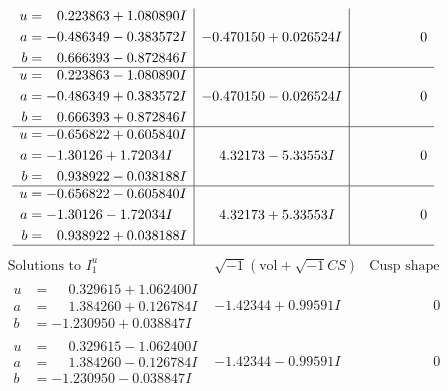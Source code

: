 \documentclass[1p]{elsarticle_modified}
\theoremstyle{definition}
\newcommand{\I}{\sqrt{-1}}
\begin{document}
$$\begin{array}{c|c|c}
\begin{aligned}
u &= \phantom{-}0.223863 + 1.080890 I \\
a &= -0.486349 - 0.383572 I \\
b &= \phantom{-}0.666393 - 0.872846 I\end{aligned}
 & -0.470150 + 0.026524 I & \phantom{-0.000000 } 0 \\ \hline\begin{aligned}
u &= \phantom{-}0.223863 - 1.080890 I \\
a &= -0.486349 + 0.383572 I \\
b &= \phantom{-}0.666393 + 0.872846 I\end{aligned}
 & -0.470150 - 0.026524 I & \phantom{-0.000000 } 0 \\ \hline\begin{aligned}
u &= -0.656822 + 0.605840 I \\
a &= -1.30126 + 1.72034 I \\
b &= \phantom{-}0.938922 - 0.038188 I\end{aligned}
 & \phantom{-}4.32173 - 5.33553 I & \phantom{-0.000000 } 0 \\ \hline\begin{aligned}
u &= -0.656822 - 0.605840 I \\
a &= -1.30126 - 1.72034 I \\
b &= \phantom{-}0.938922 + 0.038188 I\end{aligned}
 & \phantom{-}4.32173 + 5.33553 I & \phantom{-0.000000 } 0\\
 \hline 
 \end{array}$$\newpage$$\begin{array}{c|c|c}  
\text{Solutions to }I^u_{1}& \I (\text{vol} + \sqrt{-1}CS) & \text{Cusp shape}\\
 \hline 
\begin{aligned}
u &= \phantom{-}0.329615 + 1.062400 I \\
a &= \phantom{-}1.384260 + 0.126784 I \\
b &= -1.230950 + 0.038847 I\end{aligned}
 & -1.42344 + 0.99591 I & \phantom{-0.000000 } 0 \\ \hline\begin{aligned}
u &= \phantom{-}0.329615 - 1.062400 I \\
a &= \phantom{-}1.384260 - 0.126784 I \\
b &= -1.230950 - 0.038847 I\end{aligned}
 & -1.42344 - 0.99591 I & \phantom{-0.000000 } 0 \\ \hline\begin{aligned}

\end{aligned}
\end{array}$$
\end{document}
